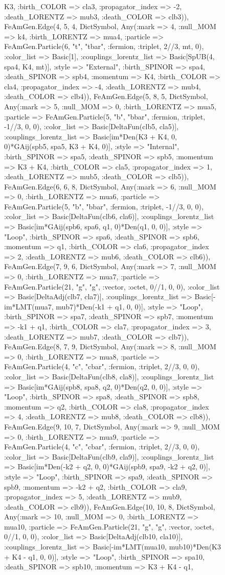\documentclass{revtex4}
\begin{document}
\begin{figure}[!htb]
\begin{center}
{K3, :birth_COLOR => cla3, :propagator_index => -2, :death_LORENTZ => mub3, :death_COLOR => clb3)), FeAmGen.Edge(4, 5, 4, Dict{Symbol, Any}(:mark => 4, :null_MOM => k4, :birth_LORENTZ => mua4, :particle => FeAmGen.Particle(6, "t", "tbar", :fermion, :triplet, 2//3, mt, 0), :color_list => Basic[1], :couplings_lorentz_list => Basic[SpUB(4, spa4, K4, mt)], :style => "External", :birth_SPINOR => spa4, :death_SPINOR => spb4, :momentum => K4, :birth_COLOR => cla4, :propagator_index => -4, :death_LORENTZ => mub4, :death_COLOR => clb4)), FeAmGen.Edge(5, 8, 5, Dict{Symbol, Any}(:mark => 5, :null_MOM => 0, :birth_LORENTZ => mua5, :particle => FeAmGen.Particle(5, "b", "bbar", :fermion, :triplet, -1//3, 0, 0), :color_list => Basic[DeltaFun(clb5, cla5)], :couplings_lorentz_list => Basic[im*Den(K3 + K4, 0, 0)*GAij(spb5, spa5, K3 + K4, 0)], :style => "Internal", :birth_SPINOR => spa5, :death_SPINOR => spb5, :momentum => K3 + K4, :birth_COLOR => cla5, :propagator_index => 1, :death_LORENTZ => mub5, :death_COLOR => clb5)), FeAmGen.Edge(6, 6, 8, Dict{Symbol, Any}(:mark => 6, :null_MOM => 0, :birth_LORENTZ => mua6, :particle => FeAmGen.Particle(5, "b", "bbar", :fermion, :triplet, -1//3, 0, 0), :color_list => Basic[DeltaFun(clb6, cla6)], :couplings_lorentz_list => Basic[im*GAij(spb6, spa6, q1, 0)*Den(q1, 0, 0)], :style => "Loop", :birth_SPINOR => spa6, :death_SPINOR => spb6, :momentum => q1, :birth_COLOR => cla6, :propagator_index => 2, :death_LORENTZ => mub6, :death_COLOR => clb6)), FeAmGen.Edge(7, 9, 6, Dict{Symbol, Any}(:mark => 7, :null_MOM => 0, :birth_LORENTZ => mua7, :particle => FeAmGen.Particle(21, "g", "g", :vector, :octet, 0//1, 0, 0), :color_list => Basic[DeltaAdj(clb7, cla7)], :couplings_lorentz_list => Basic[-im*LMT(mua7, mub7)*Den(-k1 + q1, 0, 0)], :style => "Loop", :birth_SPINOR => spa7, :death_SPINOR => spb7, :momentum => -k1 + q1, :birth_COLOR => cla7, :propagator_index => 3, :death_LORENTZ => mub7, :death_COLOR => clb7)), FeAmGen.Edge(8, 7, 9, Dict{Symbol, Any}(:mark => 8, :null_MOM => 0, :birth_LORENTZ => mua8, :particle => FeAmGen.Particle(4, "c", "cbar", :fermion, :triplet, 2//3, 0, 0), :color_list => Basic[DeltaFun(clb8, cla8)], :couplings_lorentz_list => Basic[im*GAij(spb8, spa8, q2, 0)*Den(q2, 0, 0)], :style => "Loop", :birth_SPINOR => spa8, :death_SPINOR => spb8, :momentum => q2, :birth_COLOR => cla8, :propagator_index => 4, :death_LORENTZ => mub8, :death_COLOR => clb8)), FeAmGen.Edge(9, 10, 7, Dict{Symbol, Any}(:mark => 9, :null_MOM => 0, :birth_LORENTZ => mua9, :particle => FeAmGen.Particle(4, "c", "cbar", :fermion, :triplet, 2//3, 0, 0), :color_list => Basic[DeltaFun(clb9, cla9)], :couplings_lorentz_list => Basic[im*Den(-k2 + q2, 0, 0)*GAij(spb9, spa9, -k2 + q2, 0)], :style => "Loop", :birth_SPINOR => spa9, :death_SPINOR => spb9, :momentum => -k2 + q2, :birth_COLOR => cla9, :propagator_index => 5, :death_LORENTZ => mub9, :death_COLOR => clb9)), FeAmGen.Edge(10, 10, 8, Dict{Symbol, Any}(:mark => 10, :null_MOM => 0, :birth_LORENTZ => mua10, :particle => FeAmGen.Particle(21, "g", "g", :vector, :octet, 0//1, 0, 0), :color_list => Basic[DeltaAdj(clb10, cla10)], :couplings_lorentz_list => Basic[-im*LMT(mua10, mub10)*Den(K3 + K4 - q1, 0, 0)], :style => "Loop", :birth_SPINOR => spa10, :death_SPINOR => spb10, :momentum => K3 + K4 - q1, }
\end{center}
\end{figure}
\end{document}
